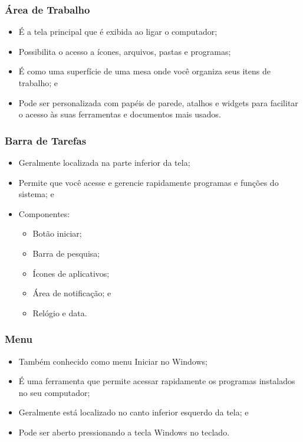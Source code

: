 \documentclass[aspectratio=169]{beamer} %
\begin{document}
\begin{frame}
	\frametitle{Área de Trabalho}
	
	\begin{itemize}
		\item É a tela principal que é exibida ao ligar o computador;
		\item Possibilita o acesso a ícones, arquivos, pastas e programas;
		\item É como uma superfície de uma mesa onde você organiza seus itens de trabalho; e
		\item Pode ser personalizada com papéis de parede, atalhos e widgets para facilitar o acesso às suas ferramentas e documentos mais usados.
	\end{itemize}
\end{frame}

\begin{frame}
	\frametitle{Barra de Tarefas}
	
	\begin{itemize}
		\item Geralmente localizada na parte inferior da tela;
		\item Permite que você acesse e gerencie rapidamente programas e funções do sistema; e
		\item Componentes:
		\begin{itemize}
			\item Botão iniciar;
			\item Barra de pesquisa;
			\item Ícones de aplicativos;
			\item Área de notificação; e
			\item Relógio e data.
		\end{itemize}
	\end{itemize}
\end{frame}

\begin{frame}
	\frametitle{Menu}
	
	\begin{itemize}
		\item Também conhecido como menu Iniciar no Windows;
		\item É uma ferramenta que permite acessar rapidamente os programas instalados no seu computador;
		\item Geralmente está localizado no canto inferior esquerdo da tela; e
		\item Pode ser aberto pressionando a tecla Windows no teclado.
	\end{itemize}
\end{frame}
\end{document}
